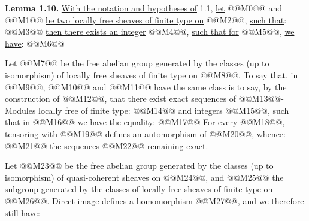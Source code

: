 \textbf{Lemma 1.10.} \uline{With the notation and hypotheses of} 1.1, \uline{let} @@M0@@ and @@M1@@ \uline{be two locally free sheaves of finite type on} @@M2@@, \uline{such that}:
@@M3@@
\uline{then there exists an integer} @@M4@@, \uline{such that for} @@M5@@, \uline{we have}:
@@M6@@

Let @@M7@@ be the free abelian group generated by the classes (up to isomorphism) of locally free sheaves of finite type on @@M8@@. To say that, in @@M9@@, @@M10@@ and @@M11@@ have the same class is to say, by the construction of @@M12@@, that there exist exact sequences of @@M13@@-Modules locally free of finite type:
@@M14@@
and integers @@M15@@, such that in @@M16@@ we have the equality:
@@M17@@
For every @@M18@@, tensoring with @@M19@@ defines an automorphism of @@M20@@, whence:
@@M21@@
the sequences @@M22@@ remaining exact.

Let @@M23@@ be the free abelian group generated by the classes (up to isomorphism) of quasi-coherent sheaves on @@M24@@, and @@M25@@ the subgroup generated by the classes of locally free sheaves of finite type on @@M26@@. Direct image defines a homomorphism @@M27@@, and we therefore still have:
